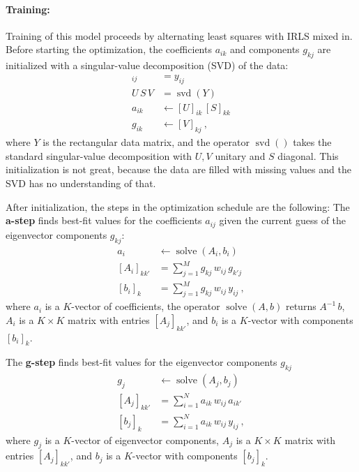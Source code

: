 \documentclass{article}
\DeclareMathOperator{\solve}{solve}
\DeclareMathOperator{\svd}{svd}
\begin{document}
\paragraph{Training:}
Training of this model proceeds by alternating least squares with IRLS mixed in.
Before starting the optimization, the coefficients $a_{ik}$ and components $g_{kj}$ are initialized with a singular-value decomposition (SVD) of the data:
\begin{align}
    [Y]_{ij} &= y_{ij} \\
    U\,S\,V &= \svd(Y) \\
    a_{ik} &\leftarrow [U]_{ik}\,[S]_{kk} \\
    g_{ik} &\leftarrow [V]_{kj} ~,
\end{align}
where $Y$ is the rectangular data matrix,
and the operator $\svd()$ takes the standard singular-value decomposition with $U, V$ unitary and $S$ diagonal.
This initialization is not great, because the data are filled with missing values and the SVD has no understanding of that.

After initialization, the steps in the optimization schedule are the following:
The \textbf{a-step} finds best-fit values for the coefficients $a_{ij}$ given the current guess of the eigenvector components $g_{kj}$:
\begin{align}
    a_i &\leftarrow \solve(A_i, b_i) \label{eq:a-step} \\
    [A_i]_{kk'} &= \sum_{j=1}^M g_{kj}\,w_{ij}\,g_{k'j} \\
    [b_i]_k     &= \sum_{j=1}^M g_{kj}\,w_{ij}\,y_{ij} ~,
\end{align}
where $a_i$ is a $K$-vector of coefficients,
the operator $\solve(A, b)$ returns $A^{-1}\,b$,
$A_i$ is a $K\times K$ matrix with entries $[A_j]_{kk'}$,
and $b_i$ is a $K$-vector with components $[b_i]_k$.

The \textbf{g-step} finds best-fit values for the eigenvector components $g_{kj}$
\begin{align}
    g_j &\leftarrow \solve(A_j, b_j) \label{eq:g-step} \\
    [A_j]_{kk'} &= \sum_{i=1}^N a_{ik}\,w_{ij}\,a_{ik'} \\
    [b_j]_k     &= \sum_{i=1}^N a_{ik}\,w_{ij}\,y_{ij} ~,
\end{align}
where $g_j$ is a $K$-vector of eigenvector components,
$A_j$ is a $K\times K$ matrix with entries $[A_j]_{kk'}$,
and $b_j$ is a $K$-vector with components $[b_j]_k$.
\end{document}
